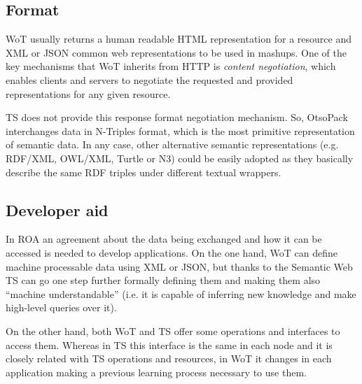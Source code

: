 \subsection{Format}
WoT usually returns a human readable HTML representation for a resource and XML or JSON common web representations to be used in mashups. One of the
key mechanisms that WoT inherits from HTTP is \textit{content negotiation}, which enables clients and servers to negotiate the requested and
provided representations for any given resource.

TS does not provide this response format negotiation mechanism. So, OtsoPack interchanges data in N-Triples format, which is the most primitive
representation of semantic data. In any case, other alternative semantic representations (e.g. RDF/XML, OWL/XML, Turtle or N3) could be
easily adopted as they basically describe the same RDF triples under different textual wrappers.

\subsection{Developer aid}%
In ROA an agreement about the data being exchanged and how it can be accessed is needed to develop applications.
On the one hand, WoT can define machine processable data using XML or JSON, but thanks to the Semantic Web TS can go one step
further formally defining them and making them also ``machine understandable'' (i.e. it is capable of inferring new knowledge and make
high-level queries over it).

On the other hand, both WoT and TS offer some operations and interfaces to access them. Whereas in TS this interface is the same in each node
and it is closely related with TS operations and resources, in WoT it changes in each application making a previous learning process necessary
to use them.


